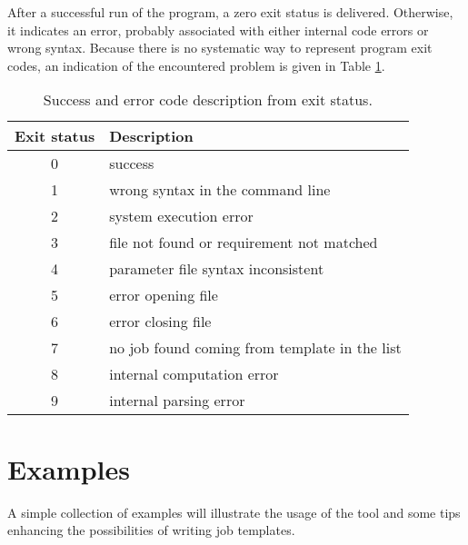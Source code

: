 \documentclass[12pt,a4paper]{article}
\newcommand{\tab}[1]{Table \ref{#1}}
\begin{document}
After a successful run of the program, a zero exit status is delivered. Otherwise, it indicates an error, probably associated with either internal code errors or wrong syntax. Because there is no systematic way to represent program exit codes, an indication of the encountered problem is given in \tab{error}.
\begin{table}
\center
\begin{tabular}{cp{50ex}}
\hline
{Exit status} & {Description}\\
\hline
0 & success\\
1 & wrong syntax in the command line\\
2 & system execution error\\
3 & file not found or requirement not matched\\
4 & parameter file syntax inconsistent\\
5 & error opening file\\
6 & error closing file\\
7 & no job found coming from template in the list\\
8 & internal computation error\\
9 & internal parsing error\\
\hline
\end{tabular}
\caption{Success and error code description from exit status.}
\label{error}
\end{table}

\section{Examples}\label{examples}
A simple collection of examples will illustrate the usage of the tool and some tips enhancing the possibilities of writing job templates.
\end{document}
